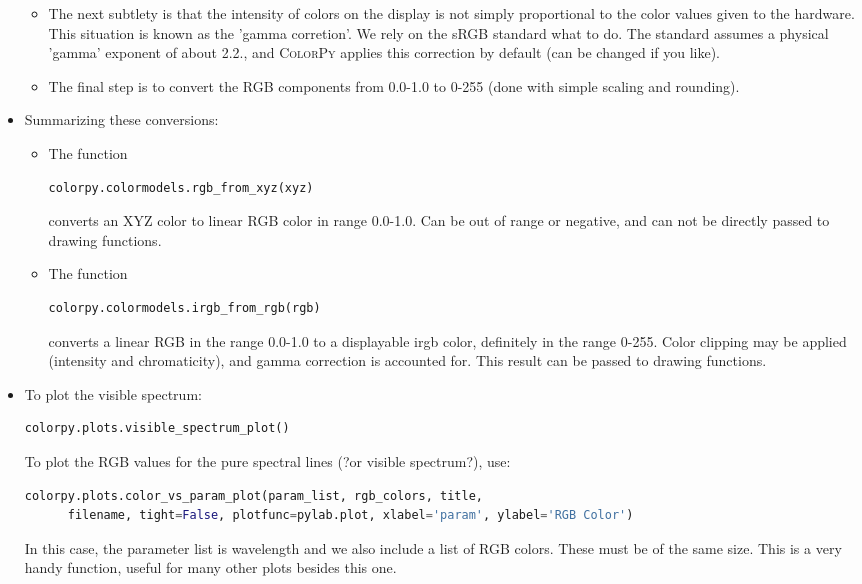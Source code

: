 \begin{itemize}
\begin{itemize}
      \item The next subtlety is that the intensity of colors on the display is not simply
         proportional to the color values given to the hardware. This situation is known as 
         the 'gamma corretion'. We rely on the sRGB standard what to do. The standard assumes a 
         physical 'gamma' exponent of about 2.2., and \textsc{ColorPy} applies this correction by default
         (can be changed if you like).
      \item The final step is to convert the RGB components from 0.0-1.0 to 0-255 (done with simple scaling
         and rounding).
   \end{itemize}
\item Summarizing these conversions:
   \begin{itemize}
      \item The function
\begin{lstlisting}[style=FormattedNumber, language=python, frame=none]
   colorpy.colormodels.rgb_from_xyz(xyz)
\end{lstlisting}
      converts an XYZ color to linear RGB color in range 0.0-1.0. Can be out of range or negative, and
      can not be directly passed to drawing functions.
   \item The function
\begin{lstlisting}[style=FormattedNumber, language=python, frame=none]
   colorpy.colormodels.irgb_from_rgb(rgb)
\end{lstlisting}
      converts a linear RGB in the range 0.0-1.0 to a displayable irgb color, definitely in the range 
      0-255. Color clipping may be applied (intensity and chromaticity), and gamma correction is 
      accounted for. This result can be passed to drawing functions.
   \end{itemize}

\item To plot the visible spectrum:
\begin{lstlisting}[style=FormattedNumber, language=python, frame=none]
   colorpy.plots.visible_spectrum_plot()
\end{lstlisting}
To plot the RGB values for the pure spectral lines (?or visible spectrum?), use:
\begin{lstlisting}[style=FormattedNumber, language=python, frame=none]
   colorpy.plots.color_vs_param_plot(param_list, rgb_colors, title, 
      filename, tight=False, plotfunc=pylab.plot, xlabel='param', ylabel='RGB Color')
\end{lstlisting}
In this case, the parameter list is wavelength and we also include a list of RGB colors. These must be of
the same size. This is a very handy function, useful for many other plots besides this one.


\end{itemize}
